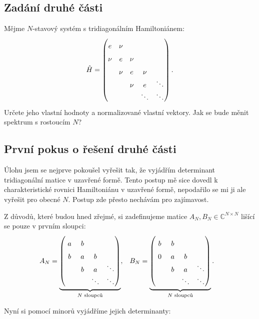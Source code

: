 \documentclass[10pt,a4paper]{article}
\newcommand{\mat}[1]{
    \begin{pmatrix}
        #1
    \end{pmatrix}
}
\begin{document}
\subsection{Zadání druhé části}
Mějme $N$-stavový systém s tridiagonálním Hamiltoniánem:
\begin{align*}
    \hat H = \mat{
        e   & \nu & \vphantom{\ddots} \\
        \nu & e   & \nu & \vphantom{\ddots} \\
            & \nu & e   & \nu & \vphantom{\ddots} \\
            &     & \nu & e   & \ddots \\
            &     &     & \ddots & \ddots
    }.
\end{align*}
Určete jeho vlastní hodnoty a normalizované vlastní vektory. Jak se bude měnit spektrum s rostoucím $N$?

\subsection{První pokus o řešení druhé části}
Úlohu jsem se nejprve pokoušel vyřešit tak, že vyjádřím determinant tridiagonální matice v uzavřené formě. Tento postup mě sice dovedl k charakteristické rovnici Hamiltoniánu v uzavřené formě, nepodařilo se mi ji ale vyřešit pro obecné $N$. Postup zde přesto nechávám pro zajímavost.

\bigskip

Z důvodů, které budou hned zřejmé, si zadefinujeme matice $A_N, B_N \in \mathbb{C}^{N \times N}$ lišící se pouze v prvním sloupci:
\begin{align*}
    &A_N =
    \underbrace{
        \mat{
            a & b & \vphantom{\ddots} \\
            b & a & b & \vphantom{\ddots} \\
                & b & a   & \ddots \\
            \phantom{\ddots} &     & \ddots & \ddots
        }
    }_{N \text{ sloupců}},
    &
    &B_N =
    \underbrace{
        \mat{
            b & b & \vphantom{\ddots} \\
            0 & a & b & \vphantom{\ddots} \\
                & b & a   & \ddots \\
            \phantom{\ddots} &     & \ddots & \ddots
        }
    }_{N \text{ sloupců}}.
\end{align*}

Nyní si pomocí minorů vyjádříme jejich determinanty:
\end{document}
